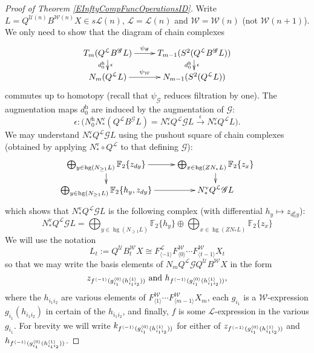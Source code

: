 \documentclass[11pt]{amsart} \renewcommand{\baselinestretch}{1.2}
\theoremstyle{plain}
\numberwithin{equation}{section} %
\theoremstyle{plain}
\numberwithin{equation}{chapter} %
\DeclareMathOperator{\homog}{hg}
\renewcommand{\to}{\longrightarrow}
\newcommand{\scrG}{\mathscr{G}}
\newcommand{\calU}{\mathcal{U}}
\newcommand{\calL}{\mathcal{L}}
\newcommand{\calw}{\mathcal{W}}
\newcommand{\call}{\mathcal{L}}
\newcommand{\BSW}{{\scrG}}
\newcommand{\BSWres}{B^\BSW}%
\newcommand{\F}{\mathbb{F}}
\newcommand{\Ftwo}{\F_2}
\newcommand{\uver}{^\mathrm{v}}
\newcommand{\uhor}{^\mathrm{h}}
\renewcommand{\mapsto}{\longmapsto}
\begin{document}
\begin{Operations in composite functor spectral sequences}
\begin{proof}[Proof of Theorem \ref{EInftyCompFuncOperationsID}]
Write $L=Q^{\calU(n)} B^{\calw(n)}X \in s\calL(n)$,  $\calL=\calL(n)$ and $\calw=\calw(n)$ (not $\calw(n+1)$). We only need to show that the diagram of chain complexes
\[\xymatrix@R=4mm{
T_{m}(Q^{\calL}\BSWres L)
\ar[r]^-{\psi_\BSW}
\ar[d]^-{\epsilon}_-{d\uhor_0}
&%
T_{m-1}(S^2(Q^{\calL}\BSWres L))\ar[d]^-{\epsilon}_-{d\uhor_0}
\\%
N_{m}(Q^{\calL}L)
\ar[r]^-{\psi_{\calw}}
&%
N_{m-1}(S^2(Q^{\calL} L))
}\]
commutes up to homotopy (recall that $\psi_\BSW$ reduces filtration by one).  The augmentation maps $d\uhor_0$ are induced by the augmentation of $\BSW$:
\[\epsilon:\bigl(N\uhor_0N\uver_*(Q^{\call}\BSWres L)= N\uver_*Q^{\calL}\BSW L\overset{\epsilon}{\to} N\uver_*Q^{\calL}L\bigr). \]%
We may understand $ N\uver_*Q^{\calL}\BSW L$ using the pushout square of chain complexes (obtained by applying $N\uver_*\circ Q^{\call} $ to that defining $\BSW$):
\[\xymatrix@R=4mm{
\bigoplus_{y\in \homog (N_{\geq1}L)}\Ftwo\{z_{dy}\}
\ar[r]\ar[d]%
&%
\bigoplus_{x\in \homog (ZN_*L)}\Ftwo\{z_{x}\}\ar[d]\\%
\bigoplus_{y\in \homog (N_{\geq1}L)}\Ftwo\{h_y,z_{dy}\}
\ar[r]&%
N\uver_*Q^{\call}\BSW L%
}\]
which shows that $N\uver_*Q^{\call}\BSW L$ is the following complex (with differential $h_{y}\mapsto z_{d\uver_0y}$):
\[N\uver_*Q^{\call}\BSW L=\textstyle\bigoplus_{y\in \homog (N_{\geq1}L)}\Ftwo\{h_y\}\oplus \bigoplus_{x\in \homog (ZN_*L)}\Ftwo\{z_{x}\}\]
We will use the notation
\[L_t:=Q^{\calU}B^{\calw}_tX \cong F^{\calL}_{\langle -1\rangle}F^{\calw}_{\langle 0\rangle}\cdots F^{\calw}_{\langle t-1\rangle}X_t\]
so that we may write the basis elements of $N_mQ^{\calL}\BSW Q^{\calU}B^{\calw}X$ in the form
\[z_{f^{\langle -1\rangle}(g^{\smash{\langle} 0\smash{\rangle}}_{i_1}(h^{\smash{\langle} 1\smash{\rangle}}_{i_1i_2}))} \textup{ and }h_{f^{\langle -1\rangle}(g^{\smash{\langle} 0\smash{\rangle}}_{i_1}(h^{\smash{\langle} 1\smash{\rangle}}_{i_1i_2}))},\]
where the $h_{i_1i_2} $ are various elements of $ F^{\calw}_{\langle 1\rangle}\cdots F^{\calw}_{\langle m-1\rangle}X_m$, each $g_{i_1}$ is a $\calw$-expression $g_{i_1}(h_{i_1i_2})$ in certain of the $h_{i_1i_2}$, and finally, $f$ is some $\calL$-expression in the various $g_{i_1}$. %
For brevity we will write $k_{f^{\langle -1\rangle}(g^{\smash{\langle} 0\smash{\rangle}}_{i_1}(h^{\smash{\langle} 1\smash{\rangle}}_{i_1i_2}))}$ for either of $z_{f^{\langle -1\rangle}(g^{\smash{\langle} 0\smash{\rangle}}_{i_1}(h^{\smash{\langle} 1\smash{\rangle}}_{i_1i_2}))}$ and $h_{f^{\langle -1\rangle}(g^{\smash{\langle} 0\smash{\rangle}}_{i_1}(h^{\smash{\langle} 1\smash{\rangle}}_{i_1i_2}))}$.


\end{proof}
\end{Operations in composite functor spectral sequences}
\end{document}
